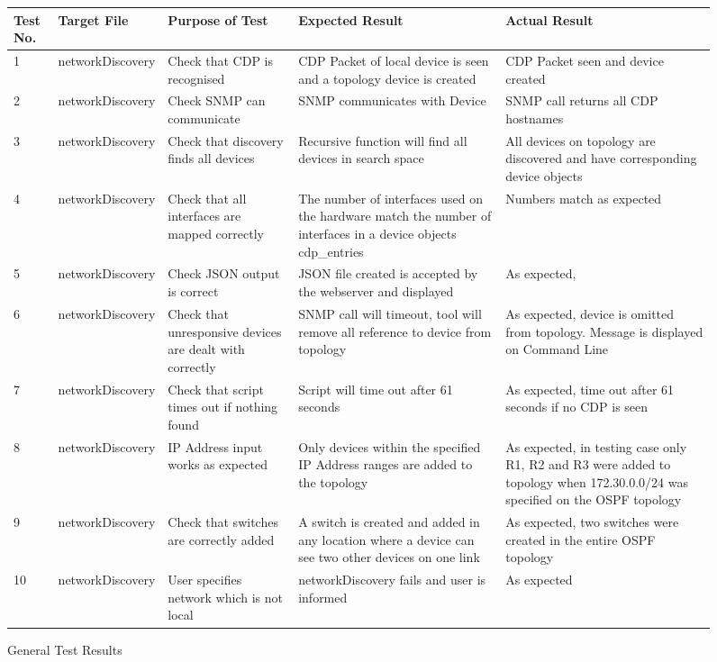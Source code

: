 \documentclass[11pt]{report}
\begin{document}
\FloatBarrier
\begin{figure}[h!]
	\caption{General Test Results}
	\centering
	\begin{tabular}{|p{0.6cm}|p{3.0cm}|p{3cm}|p{3.5cm}|p{3.5cm}|}
		\hline \textbf{Test No.} & \textbf{Target File} & \textbf{Purpose of Test} & \textbf{Expected Result} & \textbf{Actual Result} \\ 
		\hline 1 & networkDiscovery & Check that CDP is recognised & CDP Packet of local device is seen and a topology device is created &  CDP Packet seen and device created  \\ 
		\hline 2 & networkDiscovery & Check SNMP can communicate &  SNMP communicates with Device & SNMP call returns all CDP hostnames   \\ 
		\hline 3 & networkDiscovery & Check that discovery finds all devices & Recursive function will find all devices in search space &  All devices on topology are discovered and have corresponding device objects  \\ 
		\hline 4 & networkDiscovery & Check that all interfaces are mapped correctly & The number of interfaces used on the hardware match the number of interfaces in a device objects cdp\_entries  &  Numbers match as expected  \\ 
		\hline 5 & networkDiscovery & Check JSON output is correct & JSON file created is accepted by the webserver and displayed &  As expected,   \\ 
		\hline 6 & networkDiscovery & Check that unresponsive devices are dealt with correctly & SNMP call will timeout, tool will remove all reference to device from topology & As expected, device is omitted from topology. Message is displayed on Command Line  \\ 
		\hline 7 & networkDiscovery &  Check that script times out if nothing found & Script will time out after 61 seconds &  As expected, time out after 61 seconds if no CDP is seen   \\ 
		\hline 8 & networkDiscovery & IP Address input works as expected & Only devices within the specified IP Address ranges are added to the topology & As expected, in testing case only R1, R2 and R3 were added to topology when 172.30.0.0/24 was specified on the OSPF topology    \\ 
		\hline 9 & networkDiscovery & Check that switches are correctly added & A switch is created and added in any location where a device can see two other devices on one link &  As expected, two switches were created in the entire OSPF topology   \\ 
		\hline 10 & networkDiscovery & User specifies network which is not local & networkDiscovery fails and user is informed &  As expected   \\ 
		\hline 
	\end{tabular} 
\end{figure}
\FloatBarrier
\end{document}
